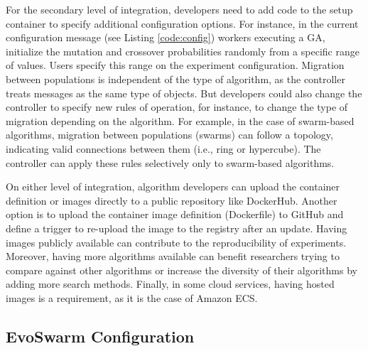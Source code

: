 \documentclass[review]{elsarticle}
\begin{document}
For the secondary level of integration, developers need to add code to the setup
container to specify additional configuration options. For instance,  %
in the current configuration message (see Listing \ref{code:config})
workers executing a GA, initialize the mutation and crossover 
probabilities randomly from a specific range of values. Users specify
this range on the experiment configuration.  %
Migration between populations is independent of the type of algorithm, as the
controller treats messages as the same type of objects. But developers could
also change the controller to specify new rules of operation, for instance, to
change the type of migration depending on the algorithm. %
For example, in the case of swarm-based algorithms,  migration between  %
populations (swarms) can follow a topology, indicating valid connections 
between them (i.e., ring or hypercube). The controller
can apply these rules selectively only to swarm-based algorithms.

On either level of integration, algorithm developers can upload the container
definition or images directly to a public repository like DockerHub. Another
option is to upload the container image definition (Dockerfile) to GitHub and
define a trigger to re-upload the image to the registry after an update. Having
images publicly available can contribute to the reproducibility of experiments.
Moreover, having more algorithms available can benefit researchers trying to
compare against other algorithms or increase the diversity of their algorithms
by adding more search methods. Finally, in some cloud services, having hosted 
images is a requirement, as it is the case of Amazon ECS.   


\subsection{EvoSwarm Configuration} 
\end{document}
